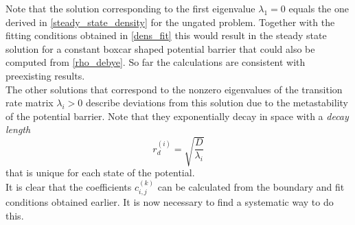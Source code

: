 Note that the solution corresponding to the first eigenvalue $\lambda_1 = 0$ equals the one derived in \eqref{steady_state_density} for the ungated problem. Together with the fitting conditions obtained in \eqref{dens_fit} this would result in the steady state solution for a constant boxcar shaped potential barrier that could also be computed from \eqref{rho_debye}. So far the calculations are consistent with preexisting results. \\
The other solutions that correspond to the nonzero eigenvalues of the transition rate matrix $\lambda_i>0$ describe deviations from this solution due to the metastability of the potential barrier. Note that they exponentially decay in space with a \textit{decay length}
\begin{equation}
    r_d^{(i)} = \sqrt{\frac{D}{\lambda_i}}
    \label{decay_length}
\end{equation}
that is unique for each state of the potential. \\
It is clear that the coefficients $c^{(k)}_{i,j}$ can be calculated from the boundary and fit conditions obtained earlier. It is now necessary to find a systematic way to do this.
